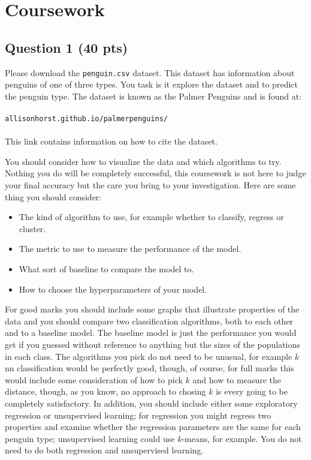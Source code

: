 \documentclass[12pt]{article}
\begin{document}
\section*{Coursework }

\subsection*{Question 1 (40 pts)}

Please download the \texttt{penguin.csv} dataset. This dataset has
information about penguins of one of three types. You task is it
explore the dataset and to predict the penguin type. The dataset is
known as the Palmer Penguins and is found at:\\
\\
\texttt{allisonhorst.github.io/palmerpenguins/}\\
\\
This link contains information on how to cite the dataset.

You should consider how to visualize the data and which algorithms to
try. Nothing you do will be completely successful, this coursework is
not here to judge your final accuracy but the care you bring to your
investigation. Here are some thing you should consider:
\begin{itemize}
  \item The kind of algorithm to use, for example whether to classify, regress  or cluster.
  \item The metric to use to measure the performance of the model.
  \item What sort of baseline to compare the model to.
  \item How to choose the hyperparameters of your model.
\end{itemize}
For good marks you should include some graphs that illustrate
properties of the data and you should compare two classification
algorithms, both to each other and to a baseline model. The baseline
model is just the performance you would get if you guessed without
reference to anything but the sizes of the populations in each
class. The algorithms you pick do not need to be unusual, for example
$k$nn classification would be perfectly good, though, of course, for
full marks this would include some consideration of how to pick $k$
and how to measure the distance, though, as you know, no approach to
chosing $k$ is every going to be completely satisfactory. In addition,
you should include either some exploratory regression or unsupervised
learning; for regression you might regress two properties and examine
whether the regression parameters are the same for each penguin type;
unsupervised learning could use $k$-means, for example. You do not
need to do both regression and unsupervised learning.
\end{document}
